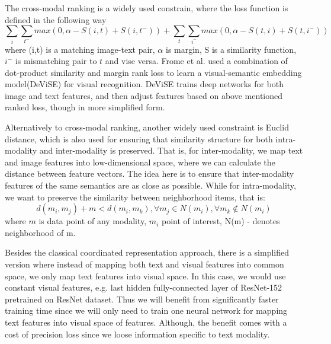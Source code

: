The cross-modal ranking is a widely used constrain, where the loss function is defined in the following way
\begin{equation} \label{eq_rank_loss}
\sum_i \sum_{t^-} max(0, \alpha - S(i, t) + S(i, t^-)) + \sum_t \sum_{i^-} max(0, \alpha - S(t, i) + S(t, i^-))
\end{equation}
where (i,t) is a matching image-text pair, $\alpha$ is margin, S is a similarity function, $i^-$ is mismatching pair to $t$ and vise versa. Frome et al.\cite{ref_devise} used a combination of dot-product similarity and margin rank loss to learn a visual-semantic embedding model(DeViSE) for visual recognition\cite{ref_survey}. DeViSE trains deep networks for both image and text features, and then adjust features based on above mentioned ranked loss, though in more simplified form.

Alternatively to cross-modal ranking, another widely used constraint is Euclid distance, which is also used for ensuring that similarity structure for both intra-modality and inter-modality is preserved. That is, for inter-modality, we map text and image features into low-dimensional space, where we can calculate the distance between feature vectors. The idea here is to ensure that inter-modality features of the same semantics are as close as possible\cite{ref_pan}. While for intra-modality, we want to preserve the similarity between neighborhood items, that is:
\begin{equation} \label{eq_eucl_loss}
d(m_i, m_j) + m < d(m_i, m_k), \forall m_j \in N(m_i), \forall m_k \notin N(m_i)
\end{equation}
where $m$ is data point of any modality, $m_i$ point of interest, N(m) - denotes neighborhood of m\cite{ref_wang}.

Besides the classical coordinated representation approach, there is a simplified version where instead of mapping both text and visual features into common space, we only map text features into visual space\cite{ref_w2vv}. In this case, we would use constant visual features, e.g. last hidden fully-connected layer of ResNet-152 pretrained on ResNet dataset\cite{ref_ResNet}. Thus we will benefit from significantly faster training time since we will only need to train one neural network for mapping text features into visual space of features. Although, the benefit comes with a cost of precision loss since we loose information specific to text modality.

